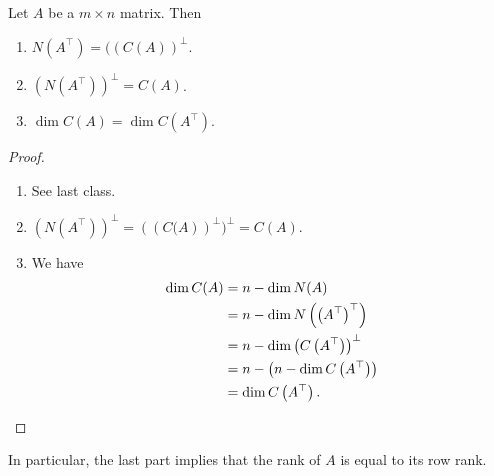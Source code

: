 \documentclass[main.tex]{subfiles}
\begin{document}
\begin{theorem}
    Let $A$ be a $m\times n$ matrix. Then
    \begin{enumerate}
        \item $N\left(A^\top\right) = ((C(A))^\perp$.
        \item $\left(N\left(A^\top\right)\right)^\perp = C(A)$.
        \item $\dim C(A) = \dim C\left(A^\top\right)$.
    \end{enumerate}
\end{theorem}

\begin{proof}
    \begin{enumerate}
        \item See last class.
        \item $\left(N\left(A^\top\right)\right)^\perp = \left(\left(C(A\right)\right)^\perp)^\perp = C(A)$.
        \item We have
        \begin{align*}
            \dim C(A) &= n - \dim N(A) \\
            &= n - \dim N\left(\left(A^\top\right)^\top\right) \\
            &= n - \dim \left(C\left(A^\top\right)\right)^\perp \\
            &= n - \left(n - \dim C\left(A^\top\right)\right) \\
            &= \dim C\left(A^\top\right).\qedhere
        \end{align*} 
    \end{enumerate}    
\end{proof}

In particular, the last part implies that the rank of $A$ is equal to its row rank.
\end{document}
